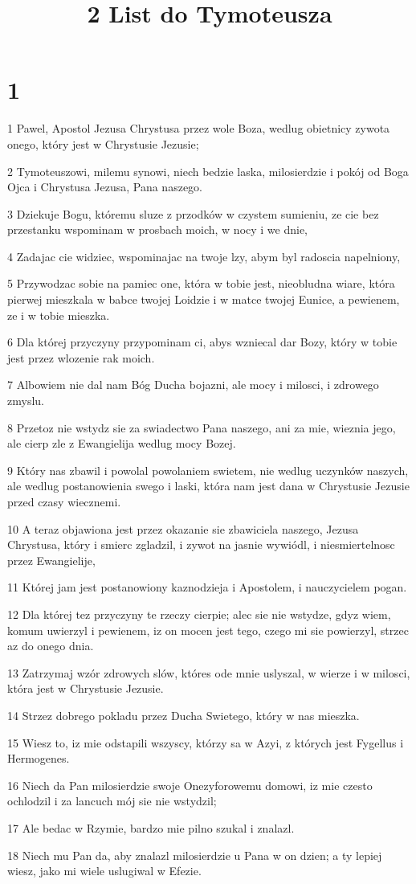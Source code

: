 

\title{2 List do Tymoteusza}


\chapter{1}

\par 1 Pawel, Apostol Jezusa Chrystusa przez wole Boza, wedlug obietnicy zywota onego, który jest w Chrystusie Jezusie;
\par 2 Tymoteuszowi, milemu synowi, niech bedzie laska, milosierdzie i pokój od Boga Ojca i Chrystusa Jezusa, Pana naszego.
\par 3 Dziekuje Bogu, któremu sluze z przodków w czystem sumieniu, ze cie bez przestanku wspominam w prosbach moich, w nocy i we dnie,
\par 4 Zadajac cie widziec, wspominajac na twoje lzy, abym byl radoscia napelniony,
\par 5 Przywodzac sobie na pamiec one, która w tobie jest, nieobludna wiare, która pierwej mieszkala w babce twojej Loidzie i w matce twojej Eunice, a pewienem, ze i w tobie mieszka.
\par 6 Dla której przyczyny przypominam ci, abys wzniecal dar Bozy, który w tobie jest przez wlozenie rak moich.
\par 7 Albowiem nie dal nam Bóg Ducha bojazni, ale mocy i milosci, i zdrowego zmyslu.
\par 8 Przetoz nie wstydz sie za swiadectwo Pana naszego, ani za mie, wieznia jego, ale cierp zle z Ewangielija wedlug mocy Bozej.
\par 9 Który nas zbawil i powolal powolaniem swietem, nie wedlug uczynków naszych, ale wedlug postanowienia swego i laski, która nam jest dana w Chrystusie Jezusie przed czasy wiecznemi.
\par 10 A teraz objawiona jest przez okazanie sie zbawiciela naszego, Jezusa Chrystusa, który i smierc zgladzil, i zywot na jasnie wywiódl, i niesmiertelnosc przez Ewangielije,
\par 11 Której jam jest postanowiony kaznodzieja i Apostolem, i nauczycielem pogan.
\par 12 Dla której tez przyczyny te rzeczy cierpie; alec sie nie wstydze, gdyz wiem, komum uwierzyl i pewienem, iz on mocen jest tego, czego mi sie powierzyl, strzec az do onego dnia.
\par 13 Zatrzymaj wzór zdrowych slów, któres ode mnie uslyszal, w wierze i w milosci, która jest w Chrystusie Jezusie.
\par 14 Strzez dobrego pokladu przez Ducha Swietego, który w nas mieszka.
\par 15 Wiesz to, iz mie odstapili wszyscy, którzy sa w Azyi, z których jest Fygellus i Hermogenes.
\par 16 Niech da Pan milosierdzie swoje Onezyforowemu domowi, iz mie czesto ochlodzil i za lancuch mój sie nie wstydzil;
\par 17 Ale bedac w Rzymie, bardzo mie pilno szukal i znalazl.
\par 18 Niech mu Pan da, aby znalazl milosierdzie u Pana w on dzien; a ty lepiej wiesz, jako mi wiele uslugiwal w Efezie.

